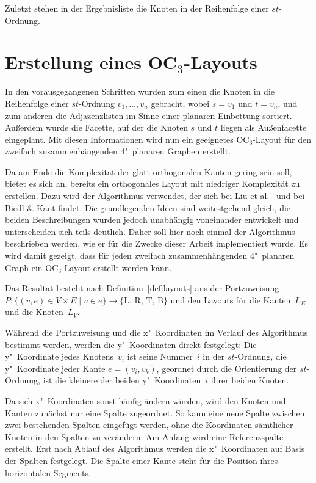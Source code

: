 \documentclass[a4paper]{scrreprt}
\theoremstyle{definition}
\begin{document}
Zuletzt stehen in der Ergebnisliste die Knoten in der Reihenfolge einer $st$-Ordnung.

\section{Erstellung eines OC$_3$-Layouts}

In den vorausgegangenen Schritten wurden zum einen die Knoten in die Reihenfolge einer $st$-Ordnung $v_1, \dots, v_n$ gebracht, wobei $s = v_1$ und $t = v_n$, und zum anderen die Adjazenzlisten im Sinne einer planaren Einbettung sortiert. Außerdem wurde die Facette, auf der die Knoten $s$ und $t$ liegen als Außenfacette eingeplant. Mit diesen Informationen wird nun ein geeignetes OC$_3$-Layout für den zweifach zusammenhängenden 4"~planaren Graphen erstellt. 

Da am Ende die Komplexität der glatt-orthogonalen Kanten gering sein soll, bietet es sich an, bereits ein orthogonales Layout mit niedriger Komplexität zu erstellen. Dazu wird der Algorithmus verwendet, der sich bei Liu et al.~\cite{liu+etal-98} und bei Biedl \& Kant \cite{biedl+kant-98} findet. Die grundlegenden Ideen sind weitestgehend gleich, die beiden Beschreibungen wurden jedoch unabhängig voneinander entwickelt und unterscheiden sich teils deutlich. Daher soll hier noch einmal der Algorithmus beschrieben werden, wie er für die Zwecke dieser Arbeit implementiert wurde. Es wird damit gezeigt, dass für jeden zweifach zusammenhängenden 4"~planaren Graph ein OC$_3$-Layout erstellt werden kann.

Das Resultat besteht nach Definition~\ref{def:layouts} aus der Portzuweisung $P: \{(v, e) \in V \times E \mid v \in e\} \to \{\text{L, R, T, B}\}$ und den Layouts für die Kanten~$L_E$ und die Knoten~$L_V$.

Während die Portzuweisung und die x"~Koordinaten im Verlauf des Algorithmus bestimmt werden, werden die y"~Koordinaten direkt festgelegt: Die y"~Koordinate jedes Knotens~$v_i$ ist seine Nummer~$i$ in der $st$-Ordnung, die y"~Koordinate jeder Kante $e = (v_i, v_k)$, geordnet durch die Orientierung der $st$-Ordnung, ist die kleinere der beiden y"~Koordinaten~$i$ ihrer beiden Knoten.

Da sich x"~Koordinaten sonst häufig ändern würden, wird den Knoten und Kanten zunächst nur eine Spalte zugeordnet. So kann eine neue Spalte zwischen zwei bestehenden Spalten eingefügt werden, ohne die Koordinaten sämtlicher Knoten in den Spalten zu verändern. Am Anfang wird eine Referenzspalte erstellt. Erst nach Ablauf des Algorithmus werden die x"~Koordinaten auf Basis der Spalten festgelegt. Die Spalte einer Kante steht für die Position ihres horizontalen Segments.
\end{document}
